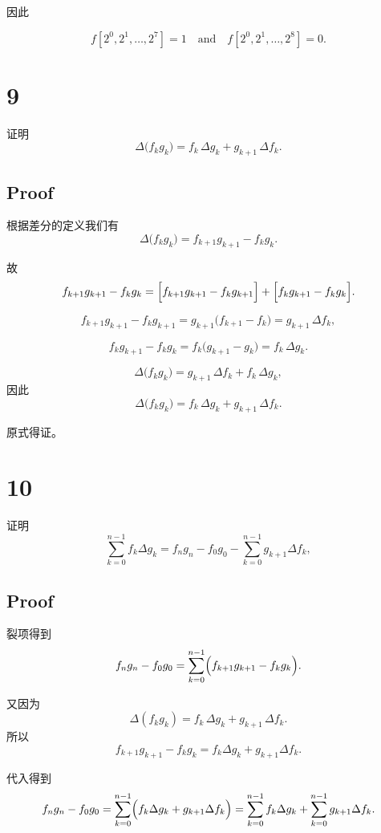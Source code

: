 \documentclass[11pt]{article}
\begin{document}
因此

\[
\boxed{f[2^0,2^1,\dots,2^7] = 1 \quad\text{and}\quad f[2^0,2^1,\dots,2^8] = 0.}
\]

    \section{9}\label{section}

证明 \[
\Delta\bigl(f_k g_k\bigr) = f_k\,\Delta g_k + g_{k+1}\,\Delta f_k.
\]

\subsection{Proof}\label{proof}

根据差分的定义我们有 \[
   \Delta\bigl(f_k g_k\bigr) = f_{k+1}g_{k+1} - f_k g_k.
   \]

故 \[
   f_{k+1}g_{k+1} - f_kg_k = \Bigl[f_{k+1}g_{k+1} - f_k g_{k+1}\Bigr] + \Bigl[f_k g_{k+1} - f_k g_k\Bigr].
   \]

\[
   f_{k+1}g_{k+1} - f_kg_{k+1} = g_{k+1}\bigl(f_{k+1} - f_k\bigr) = g_{k+1}\,\Delta f_k,
   \]

\[
   f_k g_{k+1} - f_k g_k = f_k\bigl(g_{k+1} - g_k\bigr) = f_k\,\Delta g_k.
   \]

\[
   \Delta\bigl(f_k g_k\bigr) = g_{k+1}\,\Delta f_k + f_k\,\Delta g_k,
   \] 因此 \[
   \boxed{\Delta\bigl(f_k g_k\bigr) = f_k\,\Delta g_k + g_{k+1}\,\Delta f_k.}
   \]

原式得证。

    \section{10}\label{section}

证明 \[
\sum_{k = 0}^{n - 1}f_k\Delta g_k = f_n g_n - f_0 g_0 - \sum_{k = 0}^{n - 1}g_{k + 1}\Delta f_k,
\]

\subsection{Proof}\label{proof}

裂项得到 \[
   f_n g_n - f_0 g_0 = \sum_{k=0}^{n-1}\Bigl( f_{k+1}g_{k+1} - f_k g_k \Bigr).
   \]

又因为 \[
   \Delta(f_k g_k) = f_k\,\Delta g_k + g_{k+1}\,\Delta f_k.
   \] 所以 \[
   f_{k+1}g_{k+1} - f_k g_k = f_k\Delta g_k + g_{k+1}\Delta f_k.
   \]

代入得到 \[
   f_n g_n - f_0 g_0 = \sum_{k=0}^{n-1}\Bigl( f_k\Delta g_k + g_{k+1}\Delta f_k\Bigr)
   = \sum_{k=0}^{n-1}f_k\Delta g_k + \sum_{k=0}^{n-1} g_{k+1}\Delta f_k.
   \]
\end{document}
